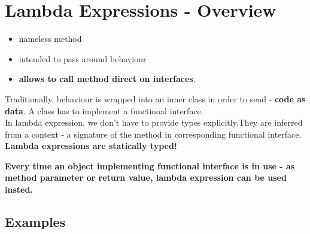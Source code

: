 \documentclass{report}
\begin{document}
\section{Lambda Expressions - Overview}
\begin{itemize}
	\item nameless method
	\item intended to pass around behaviour
	\item \textbf{allows to call method direct on interfaces}.
\end{itemize}
Traditionally, behaviour is wrapped into an inner class in order to send - \textbf{code as data}. A class has to implement a functional interface.\\
In lambda expression, we don't have to provide types explicitly.They are inferred from a context - a signature of the method in corresponding functional interface.\\
\textbf{Lambda expressions are statically typed!}
\par \textbf{Every time an object implementing functional interface is in use - as method parameter or return value, lambda expression can be used insted.}

\subsection*{Examples}
\end{document}
